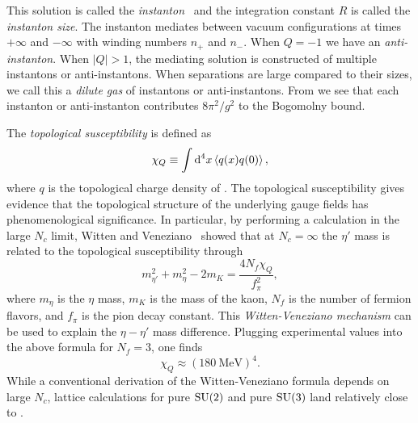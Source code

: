 This solution is called the {\it instanton}~\cite{belavin_pseudoparticle_1975}
and the integration constant $R$ is called the 
{\it instanton size}. 
The instanton mediates between vacuum configurations at times
$+\infty$ and $-\infty$ with winding numbers $n_+$ and $n_-$.
When $Q=-1$ we have an {\it anti-instanton}.
When $|Q|>1$, the mediating solution is constructed of multiple 
instantons or anti-instantons. When separations are large compared
to their sizes, we call this a {\it dilute gas} of instantons
or anti-instantons. From 
we see that each instanton or anti-instanton contributes
$8\pi^2/g^2$ to the Bogomolny bound.

The {\it topological susceptibility} is defined as
\begin{equation}
  \chi_Q\equiv\int\dd[4]{x}\ev{q(x)q(0)},
\end{equation}
where $q$ is the topological charge density of .
The topological susceptibility gives evidence that the topological
structure of the underlying gauge fields has phenomenological significance.
In particular, by performing a calculation in the large $N_c$ limit, 
Witten and Veneziano~\cite{witten_current_1979,veneziano_u1_1979} showed
that at $N_c=\infty$ the $\eta'$ mass is related to 
the topological susceptibility through
\begin{equation}
  m_{\eta'}^2+m_\eta^2-2m_K=\frac{4N_f\chi_Q}{f_\pi^2},
\end{equation}
where $m_\eta$ is the $\eta$ mass, $m_K$ is the mass of the
kaon, 
$N_f$ is the number of fermion flavors, and $f_\pi$ is the
pion decay constant. This {\it Witten-Veneziano
mechanism} can be used to explain the 
$\eta-\eta'$ mass difference. 
Plugging experimental values into the above
formula for $N_f=3$, one finds
\begin{equation}\label{eq:chivalue}
  \chi_Q\approx(180~\text{MeV})^4.
\end{equation}
While a conventional derivation of the Witten-Veneziano formula depends
on large $N_c$, lattice calculations for pure $\operatorname{SU}(2)$ and
pure $\operatorname{SU}(3)$ land relatively close to .



